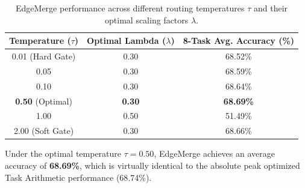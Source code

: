 \begin{table}[t]
\caption{EdgeMerge performance across different routing temperatures $\tau$ and their optimal scaling factors $\lambda$.}
\label{tab:edgemerge_grid}
\vskip 0.15in
\begin{center}
\begin{small}
\begin{sc}
\begin{tabular}{ccc}
\toprule
Temperature ($\tau$) & Optimal Lambda ($\lambda$) & 8-Task Avg. Accuracy (\%) \\
\midrule
0.01 (Hard Gate) & 0.30 & 68.52\% \\
0.05             & 0.30 & 68.59\% \\
0.10             & 0.30 & 68.64\% \\
\textbf{0.50} (Optimal) & \textbf{0.30} & \textbf{68.69\%} \\
1.00             & 0.50 & 51.49\% \\
2.00 (Soft Gate) & 0.30 & 68.66\% \\
\bottomrule
\end{tabular}
\end{sc}
\end{small}
\end{center}
\vskip -0.1in
\end{table}

Under the optimal temperature $\tau = 0.50$, EdgeMerge achieves an average accuracy of \textbf{68.69\%}, which is virtually identical to the absolute peak optimized Task Arithmetic performance (68.74\%).

